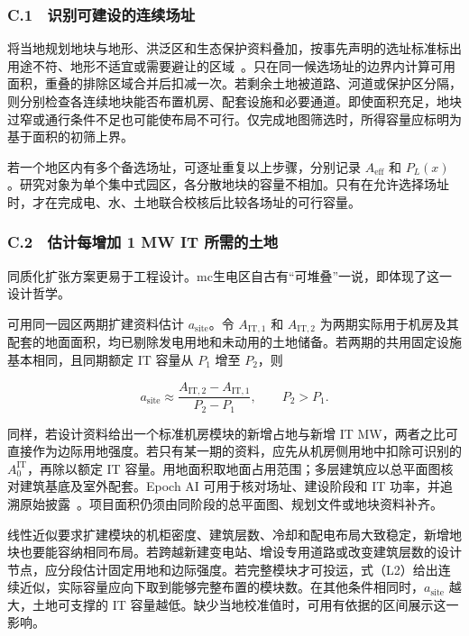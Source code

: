 \subsubsection{C.1　识别可建设的连续场址}

将当地规划地块与地形、洪泛区和生态保护资料叠加，按事先声明的选址标准标出用途不符、地形不适宜或需要避让的区域~\cite{apxrefL01}。只在同一候选场址的边界内计算可用面积，重叠的排除区域合并后扣减一次。若剩余土地被道路、河道或保护区分隔，则分别检查各连续地块能否布置机房、配套设施和必要通道。即使面积充足，地块过窄或通行条件不足也可能使布局不可行。仅完成地图筛选时，所得容量应标明为基于面积的初筛上界。

若一个地区内有多个备选场址，可逐址重复以上步骤，分别记录 $A_{\mathrm{eff}}$ 和 $P_L(x)$。研究对象为单个集中式园区，各分散地块的容量不相加。只有在允许选择场址时，才在完成电、水、土地联合校核后比较各场址的可行容量。

\subsubsection{C.2　估计每增加 1 MW IT 所需的土地}

同质化扩张方案更易于工程设计。mc生电区自古有“可堆叠”一说，即体现了这一设计哲学。

可用同一园区两期扩建资料估计 $a_{\mathrm{site}}$。令 $A_{\mathrm{IT},1}$ 和 $A_{\mathrm{IT},2}$ 为两期实际用于机房及其配套的地面面积，均已剔除发电用地和未动用的土地储备。若两期的共用固定设施基本相同，且同期额定 IT 容量从 $P_1$ 增至 $P_2$，则

\begin{equation}
a_{\mathrm{site}}\approx
\frac{A_{\mathrm{IT},2}-A_{\mathrm{IT},1}}{P_2-P_1},
\qquad P_2>P_1 .
\tag{C1}
\end{equation}

同样，若设计资料给出一个标准机房模块的新增占地与新增 IT MW，两者之比可直接作为边际用地强度。若只有某一期的资料，应先从机房侧用地中扣除可识别的 $A_0^{\mathrm{IT}}$，再除以额定 IT 容量。用地面积取地面占用范围；多层建筑应以总平面图核对建筑基底及室外配套。Epoch AI 可用于核对场址、建设阶段和 IT 功率，并追溯原始披露~\cite{apxrefL02}。项目面积仍须由同阶段的总平面图、规划文件或地块资料补齐。

线性近似要求扩建模块的机柜密度、建筑层数、冷却和配电布局大致稳定，新增地块也要能容纳相同布局。若跨越新建变电站、增设专用道路或改变建筑层数的设计节点，应分段估计固定用地和边际强度。若完整模块才可投运，式（L2）给出连续近似，实际容量应向下取到能够完整布置的模块数。在其他条件相同时，$a_{\mathrm{site}}$ 越大，土地可支撑的 IT 容量越低。缺少当地校准值时，可用有依据的区间展示这一影响。

